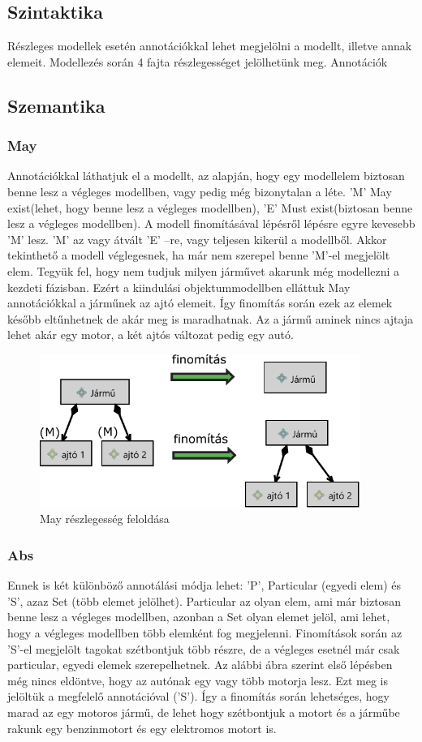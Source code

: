 \subsection{Szintaktika}
Részleges modellek esetén annotációkkal lehet megjelölni a modellt, illetve annak elemeit. Modellezés során 4 fajta részlegességet jelölhetünk meg. 
Annotációk
\subsection{Szemantika}
\subsubsection{May}

Annotációkkal láthatjuk el a modellt, az alapján, hogy egy modellelem biztosan benne lesz a végleges modellben, vagy pedig még bizonytalan a léte. ’M’ May exist(lehet, hogy benne lesz a végleges modellben), ’E’ Must exist(biztosan benne lesz a végleges modellben). A modell finomításával lépésről lépésre egyre kevesebb ’M’ lesz. ’M’ az vagy átvált ’E’ –re, vagy teljesen kikerül a modellből. Akkor tekinthető a modell véglegesnek, ha már nem szerepel benne ’M’-el megjelölt elem.
Tegyük fel, hogy nem tudjuk milyen járművet akarunk még modellezni a kezdeti fázisban. Ezért a kiindulási objektummodellben elláttuk May annotációkkal a járműnek az ajtó elemeit. Így finomítás során ezek az elemek később eltűnhetnek de akár meg is maradhatnak. Az a jármű aminek nincs ajtaja lehet akár egy motor, a két ajtós változat pedig egy autó.
\begin{figure}[htp]
	\centering
	\includegraphics[height=50mm]{figures/may.pdf}
	\caption{May részlegesség feloldása} 
\end{figure}


\subsubsection{Abs}

Ennek is két különböző annotálási módja lehet: ’P’, Particular (egyedi elem) és ’S’, azaz Set (több elemet jelölhet). Particular az olyan elem, ami már biztosan benne lesz a végleges modellben, azonban a Set olyan elemet jelöl, ami lehet, hogy a végleges modellben több elemként fog megjelenni. Finomítások során az ’S’-el megjelölt
tagokat szétbontjuk több részre, de a végleges esetnél már csak particular, egyedi elemek szerepelhetnek.
Az alábbi ábra szerint első lépésben még nincs eldöntve, hogy az autónak egy vagy több motorja lesz. Ezt meg is jelöltük a megfelelő annotációval ('S'). Így a finomítás során lehetséges, hogy marad az egy motoros jármű, de lehet hogy szétbontjuk a motort és a járműbe rakunk egy benzinmotort és egy elektromos motort is.

